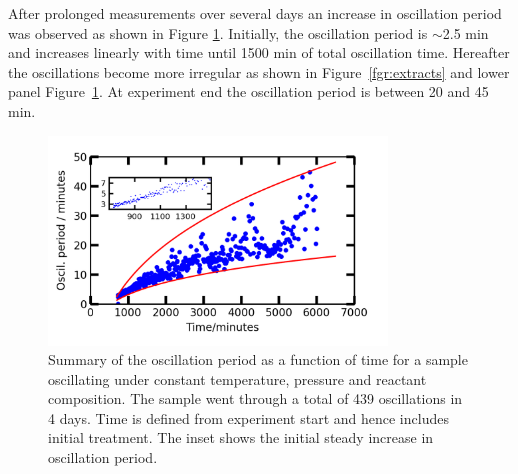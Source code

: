 \documentclass[8.5pt,twoside,twocolumn]{article}
\begin{document}
After prolonged measurements over several days an increase in oscillation period was observed as shown in Figure \ref{fgr:long_measurement}. Initially, the oscillation period is $\sim$2.5 min and increases linearly with time until 1500 min of total oscillation time. Hereafter the oscillations become more irregular as shown in Figure~\ref{fgr:extracts} and lower panel Figure~\ref{fgr:long_measurement}. At experiment end the oscillation period is between 20 and 45 min.
\begin{figure}[h]
\centering
  \includegraphics[width=9cm]{summary_of_long_measurement.png}
  \caption{Summary of the oscillation period as a function of time for a sample oscillating under constant temperature, pressure and reactant composition. The sample went through a total of 439 oscillations in 4 days. Time is defined from experiment start and hence includes initial treatment. The inset shows the initial steady increase in oscillation period.}
  \label{fgr:long_measurement}
\end{figure}
  
\end{document}
